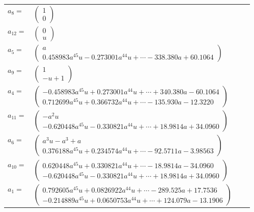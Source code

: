 \documentclass[1p]{elsarticle_modified}
\theoremstyle{definition}
\begin{document}
\begin{tabular}{m{7pt} m{180pt} m{7pt} m{180pt} }
\flushright $a_{8}=$&$\begin{pmatrix}1\\0\end{pmatrix}$ \\
\flushright $a_{12}=$&$\begin{pmatrix}0\\u\end{pmatrix}$ \\
\flushright $a_{5}=$&$\begin{pmatrix}a\\0.458983 a^{45} u-0.273001 a^{44} u+\cdots-338.380 a+60.1064\end{pmatrix}$ \\
\flushright $a_{9}=$&$\begin{pmatrix}1\\- u+1\end{pmatrix}$ \\
\flushright $a_{4}=$&$\begin{pmatrix}-0.458983 a^{45} u+0.273001 a^{44} u+\cdots+340.380 a-60.1064\\0.712699 a^{45} u+0.366732 a^{44} u+\cdots-135.930 a-12.3220\end{pmatrix}$ \\
\flushright $a_{11}=$&$\begin{pmatrix}- a^2 u\\-0.620448 a^{45} u-0.330821 a^{44} u+\cdots+18.9814 a+34.0960\end{pmatrix}$ \\
\flushright $a_{6}=$&$\begin{pmatrix}a^3 u- a^3+a\\0.376188 a^{45} u+0.234574 a^{44} u+\cdots-92.5711 a-3.98563\end{pmatrix}$ \\
\flushright $a_{10}=$&$\begin{pmatrix}0.620448 a^{45} u+0.330821 a^{44} u+\cdots-18.9814 a-34.0960\\-0.620448 a^{45} u-0.330821 a^{44} u+\cdots+18.9814 a+34.0960\end{pmatrix}$ \\
\flushright $a_{1}=$&$\begin{pmatrix}0.792605 a^{45} u+0.0826922 a^{44} u+\cdots-289.525 a+17.7536\\-0.214889 a^{45} u+0.0650753 a^{44} u+\cdots+124.079 a-13.1906\end{pmatrix}$ \\

\end{tabular}
\end{document}
